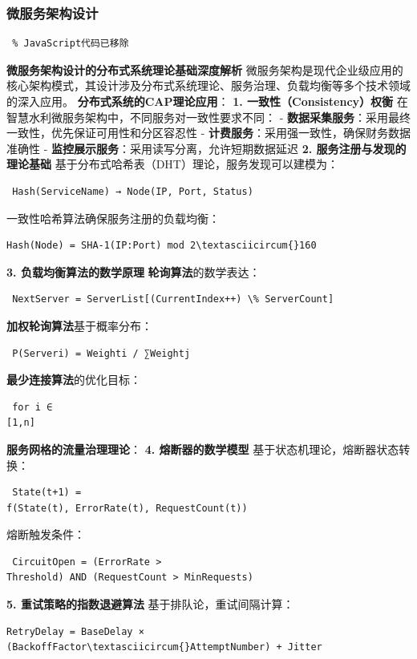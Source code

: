 {\subsubsection{微服务架构设计}\label{ux5faeux670dux52a1ux67b6ux6784ux8bbeux8ba1} \begin{lstlisting} % JavaScript代码已移除
\end{lstlisting} \textbf{微服务架构设计的分布式系统理论基础深度解析} 微服务架构是现代企业级应用的核心架构模式，其设计涉及分布式系统理论、服务治理、负载均衡等多个技术领域的深入应用。
\textbf{分布式系统的CAP理论应用}： \textbf{1. 一致性（Consistency）权衡} 在智慧水利微服务架构中，不同服务对一致性要求不同： - \textbf{数据采集服务}：采用最终一致性，优先保证可用性和分区容忍性
- \textbf{计费服务}：采用强一致性，确保财务数据准确性 - \textbf{监控展示服务}：采用读写分离，允许短期数据延迟 \textbf{2. 服务注册与发现的理论基础} 基于分布式哈希表（DHT）理论，服务发现可以建模为：
\begin{lstlisting} Hash(ServiceName) → Node(IP, Port, Status) \end{lstlisting} 一致性哈希算法确保服务注册的负载均衡： \begin{lstlisting}
Hash(Node) = SHA-1(IP:Port) mod 2\textasciicircum{}160 \end{lstlisting} \textbf{3. 负载均衡算法的数学原理} \textbf{轮询算法}的数学表达：
\begin{lstlisting} NextServer = ServerList[(CurrentIndex++) \% ServerCount] \end{lstlisting} \textbf{加权轮询算法}基于概率分布：
\begin{lstlisting} P(Serveri) = Weighti / ∑Weightj \end{lstlisting} \textbf{最少连接算法}的优化目标： \begin{lstlisting} for i ∈
[1,n] \end{lstlisting} \textbf{服务网格的流量治理理论}： \textbf{4. 熔断器的数学模型} 基于状态机理论，熔断器状态转换： \begin{lstlisting} State(t+1) =
f(State(t), ErrorRate(t), RequestCount(t)) \end{lstlisting} 熔断触发条件： \begin{lstlisting} CircuitOpen = (ErrorRate >
Threshold) AND (RequestCount > MinRequests) \end{lstlisting} \textbf{5. 重试策略的指数退避算法} 基于排队论，重试间隔计算： \begin{lstlisting}
RetryDelay = BaseDelay × (BackoffFactor\textasciicircum{}AttemptNumber) + Jitter \end{lstlisting}
}
